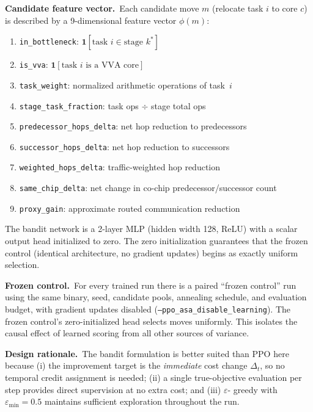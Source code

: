 \documentclass[10pt,conference]{IEEEtran}
\begin{document}
\textbf{Candidate feature vector.}\
Each candidate move $m$ (relocate task $i$ to core $c$) is described by a
9-dimensional feature vector $\phi(m)$:

\begin{enumerate}
  \item \texttt{in\_bottleneck}: $\mathbf{1}[\text{task } i \in \text{stage } k^*]$
  \item \texttt{is\_vva}: $\mathbf{1}[\text{task } i \text{ is a VVA core}]$
  \item \texttt{task\_weight}: normalized arithmetic operations of task~$i$
  \item \texttt{stage\_task\_fraction}: task ops $\div$ stage total ops
  \item \texttt{predecessor\_hops\_delta}: net hop reduction to predecessors
  \item \texttt{successor\_hops\_delta}: net hop reduction to successors
  \item \texttt{weighted\_hops\_delta}: traffic-weighted hop reduction
  \item \texttt{same\_chip\_delta}: net change in co-chip predecessor/successor count
  \item \texttt{proxy\_gain}: approximate routed communication reduction
\end{enumerate}

The bandit network is a 2-layer MLP (hidden width 128, ReLU) with a scalar
output head initialized to zero.  The zero initialization guarantees that the
frozen control (identical architecture, no gradient updates) begins as exactly
uniform selection.

\textbf{Frozen control.}\
For every trained run there is a paired ``frozen control'' run using the same
binary, seed, candidate pools, annealing schedule, and evaluation budget, with
gradient updates disabled (\texttt{--ppo\_asa\_disable\_learning}).  The frozen
control's zero-initialized head selects moves uniformly.  This isolates the
causal effect of learned scoring from all other sources of variance.

\textbf{Design rationale.}\
The bandit formulation is better suited than PPO here because (i) the
improvement target is the \emph{immediate} cost change $\Delta_t$, so no
temporal credit assignment is needed; (ii) a single true-objective evaluation
per step provides direct supervision at no extra cost; and (iii) $\varepsilon$-
greedy with $\varepsilon_{\min}=0.5$ maintains sufficient exploration throughout
the run.

\end{document}
